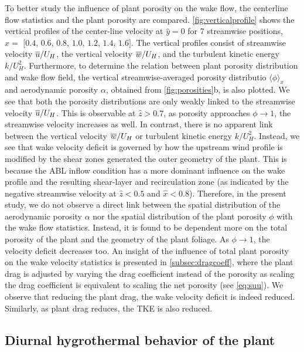 To better study the influence of plant porosity on the wake flow, the centerline flow statistics and the plant porosity are compared. \cref{fig:verticalprofile} shows the vertical profiles of the center-line velocity at $\hat{y}=0$ for 7 streamwise positions, $\hat{x} =$ $[0.4$, $0.6$, $0.8$, $1.0$, $1.2$, $1.4$, $1.6]$. The vertical profiles consist of streamwise velocity $\overline{u}/U_H$, the vertical velocity $\overline{w}/U_H$, and the turbulent kinetic energy $k/U_H^2$. Furthermore, to determine the relation between plant porosity distribution and wake flow field, the vertical streamwise-averaged porosity distributio $\langle \phi \rangle_x$ and aerodynamic porosity $\alpha$, obtained from \cref{fig:porosities}b, is also plotted. We see that both the porosity distributions are only weakly linked to the streamwise velocity $\overline{u}/U_H$. This is observable at $\hat{z}>0.7$, as porosity approaches $\phi\rightarrow1$, the streamwise velocity increases as well. In contrast, there is no apparent link between the vertical velocity $\overline{w}/U_H$ or turbulent kinetic energy $k/U_H^2$. Instead, we see that wake velocity deficit is governed by how the upstream wind profile is modified by the shear zones generated the outer geometry of the plant. This is because the ABL inflow condition has a more dominant influence on the wake profile and the resulting shear-layer and recirculation zone (as indicated by the negative streamwise velocity at $\hat{z} <0.5$ and $\hat{x}<0.8$). Therefore, in the present study, we do not observe a direct link between the spatial distribution of the aerodynamic porosity $\alpha$ nor the spatial distribution of the plant porosity $\phi$ with the wake flow statistics. Instead, it is found to be dependent more on the total porosity of the plant and the geometry of the plant foliage. As $\phi \rightarrow 1$, the velocity deficit decreases too. An insight of the influence of total plant porosity on the wake velocity statistics is presented in \cref{subsec:dragcoeff}, where the plant drag is adjusted by varying the drag coefficient instead of the porosity as scaling the drag coefficient is equivalent to scaling the net porosity (see \cref{eq:suu}). We observe that reducing the plant drag, the wake velocity deficit is indeed reduced. Similarly, as plant drag reduces, the TKE is also reduced.

\subsection{Diurnal hygrothermal behavior of the plant}
\label{subsec:diurnal}

